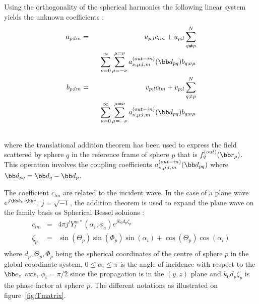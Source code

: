 Using the orthogonality of the spherical harmonics
the following linear system yields the unknown coefficients :
%
\begin{eqnarray}
  a_{p;lm} &=& u_{p;l}c_{lm} + u_{p;l}\sum_{q\neq p}^{N} \nonumber\\
    &&~~\sum_{\nu=0}^{\infty}\sum_{\mu=-\nu}^{\mu=\nu}
      a_{\nu,\mu;l,m}^{(out-in)}(\bb d_{pq})b_{q;\nu\mu}\label{eq:aplm}\\
  b_{p;lm} &=& v_{p;l}c_{lm} + v_{p;l} \sum_{q\neq p}^{N}\nonumber\\
    &&~~\sum_{\nu=0}^{\infty}\sum_{\mu=-\nu}^{\mu=\nu}
      a_{\nu,\mu;l,m}^{(out-in)}(\bb d_{pq})b_{q;\nu\mu}\label{eq:bplm}\\\nonumber
\end{eqnarray}
%
where the translational addition theorem\cite{Dufva2008} has been
used to express the field scattered by sphere $q$ in the reference
frame of sphere $p$ that is $f_q^{(out)}(\bb r_p)$.
This operation involves the coupling coefficients
$a_{\nu,\mu;l,m}^{(out-in)}(\bb d_{pq})$
where $\bb d_{pq}=\bb d_q-\bb d_p$.
%
%

The coefficient $c_{lm}$ are related to the incident wave.
In the case of a plane wave $e^{j\bb k_0\cdot\bb r}$, $j=\sqrt{-1}$,
the addition theorem is used to expand the plane wave on
the family basis os Spherical Bessel soluions :
\begin{eqnarray*}
  c_{lm}  &=& 4\pi j^l Y_l^{m*}\left(\alpha_i,\phi_a\right)e^{jk_0d_p\zeta_p}\\
  \zeta_p     &=& \sin(\Theta_p)\sin(\Phi_p)\sin(\alpha_i)+
                \cos(\Theta_p)\cos(\alpha_i)\\
\end{eqnarray*}
%
where $d_p,\Theta_p,\Phi_p$ being the spherical coordinates of the
centre of sphere $p$ in the global coordinate system,
$0\le\alpha_i\le\pi$ is the angle of incidence with respect to
the $\bb e_z$ axis, $\phi_i=\pi/2$ since the propagation is in the $(y,z)$
plane and $k_0d_p\zeta_p$ is the phase factor at sphere $p$.
The different notations as illustrated on figure~\ref{fig:Tmatrix}.

